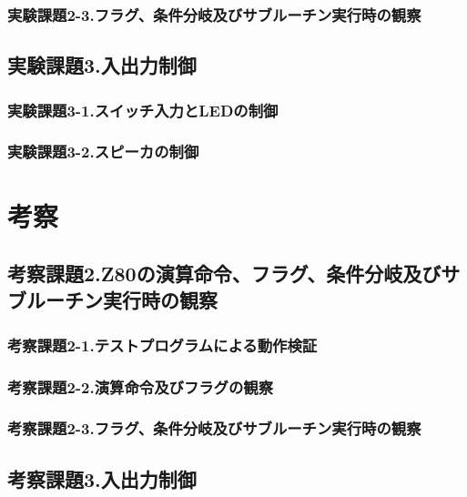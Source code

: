 \documentclass[11pt,a4j]{jsarticle}
\begin{document}
   
   \subsubsection{実験課題2-3.フラグ、条件分岐及びサブルーチン実行時の観察}
   
   
  
  \subsection{実験課題3.入出力制御}
  
   \subsubsection{実験課題3-1.スイッチ入力とLEDの制御}
   
   
   \subsubsection{実験課題3-2.スピーカの制御}
   
   
  
  
 \section{考察}
  
  \subsection{考察課題2.Z80の演算命令、フラグ、条件分岐及びサブルーチン実行時の観察}
   \subsubsection{考察課題2-1.テストプログラムによる動作検証}
   
   
   \subsubsection{考察課題2-2.演算命令及びフラグの観察}
   
   
   \subsubsection{考察課題2-3.フラグ、条件分岐及びサブルーチン実行時の観察}
   
   
  
  \subsection{考察課題3.入出力制御}
  
\end{document}
